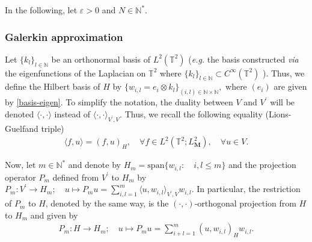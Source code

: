 \documentclass[a4paper,12pt, reqno]{amsart}
\newcommand{\T}{\mathbb{T}}
\begin{document}
In the following, let $\varepsilon>0$ and $N\in \mathbb{N}^*.$

\subsubsection{Galerkin approximation}
 Let $\{k_l\}_{l\in \mathbb{N}}$ be an orthonormal basis of $L^2(\mathbb{T}^2)$ (\textit{e.g.}  the  basis constructed \textit{via} the eigenfunctions of the Laplacian  on $\mathbb{T}^2$ where $\{k_l\}_{l\in \mathbb{N}} \subset C^\infty(\mathbb{T}^2)$  ). Thus, we define the Hilbert basis  of $H$ by $\{w_{i,l}=e_i\otimes k_l\}_{(i,l)\in \mathbb{N}\times \mathbb{N}},$
where $(e_i)$ are given by \eqref{basis-eigen}. 	To simplify the notation, the duality between	$V$	and	$V^\prime$	will	be	denoted	$\langle	\cdot,\cdot\rangle$	instead	of		$\langle	\cdot,\cdot\rangle_{V^\prime,V}$.	Thus,	we	recall	the	following	equality (Lions-Guelfand triple)
	\begin{align}\label{Lions-Gelfand-triple}
		\langle	f,u\rangle=(f,u)_H,	\quad	\forall	f\in	L^2(\T^2; L^2_\mathbf{M}),	\quad \forall	u\in	V.
	\end{align} 

	Now,	let $m\in   \mathbb{N}^*$ and
	denote	by	$H_m=\text{span}\{w_{i,l}:\quad i,l\leq m\}$	and	the		projection operator	$P_m$	defined from	$V^\prime$	to	$H_m$		by
	$P_m:V^\prime\to	H_m;\quad	u\mapsto	P_mu=\displaystyle\sum_{i,l=1}^m\langle	u,w_{i,l}\rangle_{V^\prime,V}	w_{i,l}.	$
	In	particular,	the	restriction	of	$P_m$	to	$H$,	denoted	by	the	same	way,	is	the	$(\cdot,\cdot)$-orthogonal	projection	from	$H$	to	$H_m$	and	given	by
	\begin{align}\label{def-Projection}
		P_m:H\to	H_m;\quad	u\mapsto	P_mu=\displaystyle\sum_{i+l=1}^m 
		(	u,w_{i,l})_H	w_{i,l}.		\end{align}
	
\end{document}
